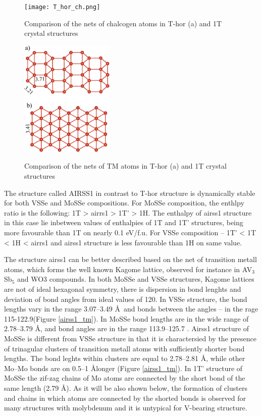 \documentclass[a4paperm]{article}
\begin{document}
\begin{figure}[H]
	\texttt{[image: T\_hor\_ch.png]} \\
	\caption{Comparison of the nets of chalcogen atoms in T-hor (a) and 1T crystal structures }
	\label{T_hor_ch}
\end{figure}

\begin{figure}[H]
	\includegraphics[width=0.4\textwidth]{T_hor_V.png} \\
	\caption{Comparison of the nets of TM atoms in T-hor (a) and 1T crystal structures }
	\label{T_hor_V}
\end{figure}


The structure called AIRSS1 in contrast to T-hor structure is dynamically stable for both VSSe and MoSSe compositions.
For MoSSe composition, the enthlpy ratio is the following: 1T > airrs1 > 1T' > 1H.
The enthalpy of airss1 structure in this case lie inbetween values of enthalpies of 1T and 1T' structures, being more favourable than 1T on nearly 0.1 eV/f.u.
For VSSe composition -- 1T' < 1T < 1H < airrs1 and airss1 structure is less favourable than 1H on same value.

The structure airss1 can be better described based on the net of transition metall atoms, which forms the well known Kagome lattice\cite{zhang2021_kagome}, observed for instance in AV$_3$Sb$_5$ \cite{ortiz2021} and WO3 \cite{gerand1979} compounds.
In both MoSSe and VSSe structures, Kagome lattices are not of ideal hexagonal symmetry, there is dispersion in bond lenghts and deviation of bond angles from ideal values of 120\textdegree.
In VSSe  structure, the bond lengths vary in the range 3.07--3.49 \AA\ and bonds between the angles – in the rage 115-122.9\textdegree (Figure \ref{airss1_tm}).
In MoSSe bond lengths are in the wide range of 2.78--3.79 \AA, and bond angles are in the range 113.9--125.7 \textdegree.
Airss1 structure of MoSSe is different from VSSe structure in that it is charactersied by the presence of trinagular clusters of transition metall atoms with sufficiently shorter bond lengths.
The bond leghts within clusters are equal to 2.78--2.81 \AA, while other Mo--Mo bonds are on 0.5--1 \AA longer (Figure \ref{airss1_tm}).
In 1T' structure of MoSSe the zif-zag chains of Mo atoms are connected by the short bond of the same length (2.79 \AA).
As it will be also shown below, the formation of clusters and chains in which atoms are connected by the shorted bonds is observed for many structures with molybdenum and it is untypical for V-bearing structure.
\end{document}
